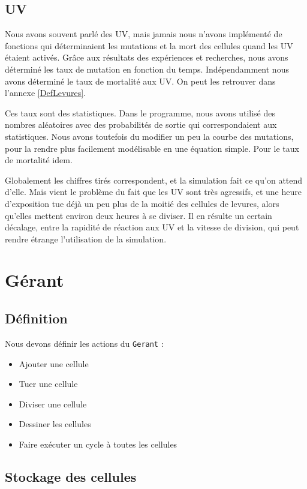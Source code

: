 \subsection{UV}
  Nous avons souvent parlé des UV, mais jamais nous n'avons implémenté de fonctions qui déterminaient les mutations et la mort des cellules quand les UV étaient activés. Grâce aux résultats des expériences et recherches, nous avons déterminé les taux de mutation en fonction du temps. Indépendamment nous avons déterminé le taux de mortalité aux UV. On peut les retrouver dans l'annexe \ref{DefLevures}.
  
  Ces taux sont des statistiques. Dans le programme, nous avons utilisé des nombres aléatoires avec des probabilités de sortie qui correspondaient aux statistiques. Nous avons toutefois du modifier un peu la courbe des mutations, pour la rendre plus facilement modélisable en une équation simple. Pour le taux de mortalité idem.
  
  Globalement les chiffres tirés correspondent, et la simulation fait ce qu'on attend d'elle. Mais vient le problème du fait que les UV sont très agressifs, et une heure d'exposition tue déjà un peu plus de la moitié des cellules de levures, alors qu'elles mettent environ deux heures à se diviser. Il en résulte un certain décalage, entre la rapidité de réaction aux UV et la vitesse de division, qui peut rendre étrange l'utilisation de la simulation.

\section{Gérant}
\subsection{Définition}
Nous devons définir les actions du \texttt{Gerant} : 
\begin{itemize}
	\item Ajouter une cellule
	\item Tuer une cellule
	\item Diviser une cellule
	\item Dessiner les cellules
	\item Faire exécuter un cycle à toutes les cellules
\end{itemize}

\subsection{Stockage des cellules}

